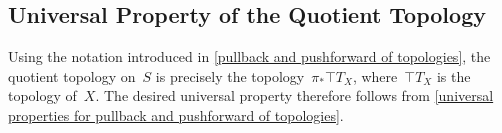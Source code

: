 \subsection{Universal Property of the Quotient Topology}

Using the notation introduced in \cref{pullback and pushforward of topologies}, the quotient topology on~$S$ is precisely the topology~$π_* \top{T}_X$, where~$\top{T}_X$ is the topology of~$X$.
The desired universal property therefore follows from \cref{universal properties for pullback and pushforward of topologies}.
